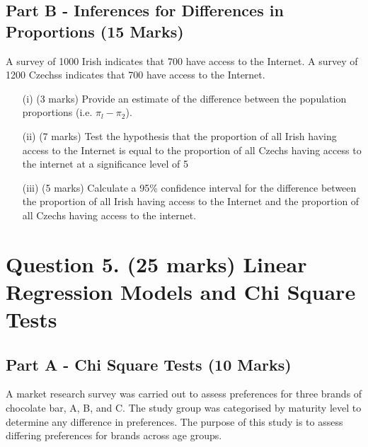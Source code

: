 \documentclass[a4paper,12pt]{article}
\begin{document}
\subsection*{Part B - Inferences for Differences in Proportions (15 Marks)}
A survey of 1000 Irish indicates that 700 have access to the Internet. A survey of 1200 Czechss
indicates that 700 have access to the Internet.
\begin{itemize}
	\item[(i)] (3 marks) Provide an estimate of the difference between the population
	proportions (i.e. $\pi_l -\pi_2$).
	
	\item[(ii)] (7 marks) Test the hypothesis that the proportion of all Irish
	having access to the Internet is equal to the proportion of all Czechs having access to the
	internet at a significance level of 5%
	
	\item[(iii)] (5 marks) Calculate a 95\% confidence interval for the difference between the proportion of all Irish
	having access to the Internet and the proportion of all Czechs having access to the
	internet.
	
	
\end{itemize}

\newpage

\section*{Question 5. (25 marks) Linear Regression Models and Chi Square Tests }
\subsection*{Part A - Chi Square Tests (10 Marks)}
A market research survey was carried out to assess preferences for three brands of chocolate bar, A, B, and C. 
The study group was categorised by maturity level to determine any difference in preferences. The purpose of this study is to assess differing preferences for brands across age groups.
\end{document}
